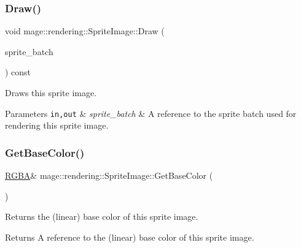 \subsubsection{\texorpdfstring{Draw()}{Draw()}}
{\footnotesize\ttfamily void mage\+::rendering\+::\+Sprite\+Image\+::\+Draw (\begin{DoxyParamCaption}\item[{\mbox{\hyperlink{classmage_1_1rendering_1_1_sprite_batch}{Sprite\+Batch}} \&}]{sprite\+\_\+batch }\end{DoxyParamCaption}) const}

Draws this sprite image.


\begin{DoxyParams}[1]{Parameters}
\mbox{\tt in,out}  & {\em sprite\+\_\+batch} & A reference to the sprite batch used for rendering this sprite image. \\
\hline
\end{DoxyParams}
\mbox{\label{classmage_1_1rendering_1_1_sprite_image_ab1ef6e7677aa9e98fa55b6d64befdd63}} 
\subsubsection{\texorpdfstring{Get\+Base\+Color()}{GetBaseColor()}\hspace{0.1cm}{\footnotesize\ttfamily [1/2]}}
{\footnotesize\ttfamily \mbox{\hyperlink{structmage_1_1_r_g_b_a}{R\+G\+BA}}\& mage\+::rendering\+::\+Sprite\+Image\+::\+Get\+Base\+Color (\begin{DoxyParamCaption}{ }\end{DoxyParamCaption})\hspace{0.3cm}{\ttfamily [noexcept]}}

Returns the (linear) base color of this sprite image.

\begin{DoxyReturn}{Returns}
A reference to the (linear) base color of this sprite image. 
\end{DoxyReturn}
\mbox{\label{classmage_1_1rendering_1_1_sprite_image_a8d86a293c822486ab1cf37a31c2b0b74}} 
